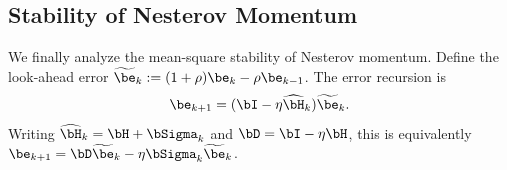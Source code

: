 

\subsection{Stability of Nesterov Momentum}
\label{app:subsec:nesterov_stability}

We finally analyze the mean-square stability of Nesterov momentum. Define the look-ahead error \(\widetilde{\be}_k:=(1+\rho)\be_k-\rho\be_{k-1}\). The error recursion is
\begin{equation}
\label{app:eq:nesterov-error-update}
\be_{k+1}=(\bI-\eta\widehat{\bH}_k)\widetilde{\be}_k.
\end{equation}
Writing \(\widehat{\bH}_k=\bH+\bSigma_k\) and \(\bD=\bI-\eta\bH\), this is equivalently \(\be_{k+1}=\bD\widetilde{\be}_k-\eta\bSigma_k\widetilde{\be}_k\).

